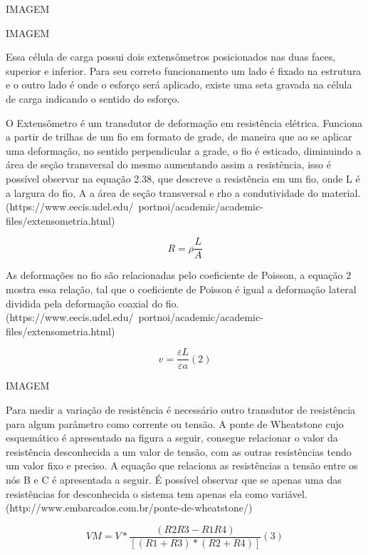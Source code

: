 IMAGEM

IMAGEM

Essa célula de carga possui dois extensômetros posicionados nas duas faces, superior e inferior. Para seu correto funcionamento um lado é fixado na estrutura e o outro lado é onde o esforço será aplicado, existe uma seta gravada na célula de carga indicando o sentido do esforço. 

O Extensômetro é um transdutor de deformação em resistência elétrica. Funciona a partir de trilhas de um fio em formato de grade, de maneira que ao se aplicar uma deformação, no sentido perpendicular a grade, o fio é esticado, diminuindo a área de seção transversal do mesmo aumentando assim a resistência, isso é possível observar na equação 2.38, que descreve a resistência em um fio, onde L é a largura do fio, A a área de seção transversal e rho a condutividade do material. (https://www.eecis.udel.edu/~portnoi/academic/academic-files/extensometria.html)

\begin{equation}
    R = \rho \frac{L}{A}
\end{equation}

As deformações no fio são relacionadas pelo coeficiente de Poisson, a equação 2 mostra essa relação, tal que o coeficiente de Poisson é igual a deformação lateral dividida pela deformação coaxial do fio. (https://www.eecis.udel.edu/~portnoi/academic/academic-files/extensometria.html)

\begin{equation}
    v = \frac{\varepsilon L}{\varepsilon a} (2)
\end{equation}

IMAGEM

Para medir a variação de resistência é necessário outro transdutor de resistência para algum parâmetro como corrente ou tensão. A ponte de Wheatstone cujo esquemático é apresentado na figura a seguir, consegue relacionar o valor da resistência desconhecida a um valor de tensão, com as outras resistências tendo um valor fixo e preciso. A equação que relaciona as resistências a tensão entre os nós B e C é apresentada a seguir. É possível observar que se apenas uma das resistências for desconhecida o sistema tem apenas ela como variável. (http://www.embarcados.com.br/ponte-de-wheatstone/)

\begin{equation}
    VM = V * \frac{(R2R3 - R1R4)}{[(R1+R3)*(R2+R4)]} (3)
\end{equation}

